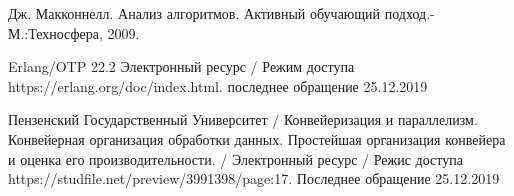 \documentclass[a4paper, 14pt]{article}
\begin{document}
	\newpage
	\begin{thebibliography}{4}
		
		Дж. Макконнелл. Анализ алгоритмов. Активный обучающий подход.-
		М.:Техносфера, 2009.
		
		Erlang/OTP 22.2 Электронный ресурс / Режим доступа https://erlang.org/doc/index.html. последнее обращение 25.12.2019
	
		Пензенский Государственный Университет / Конвейеризация и параллелизм. Конвейерная организация обработки данных. Простейшая организация конвейера и оценка его производительности. / Электронный ресурс / Режис доступа https://studfile.net/preview/3991398/page:17.
		Последнее обращение 25.12.2019
		
	\end{thebibliography}
\end{document}
